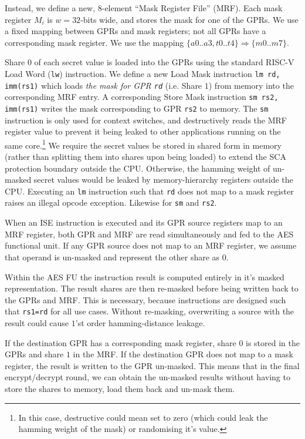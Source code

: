 Instead, we define a new, $8$-element ``Mask Register File'' (MRF).
Each mask register $M_i$ is $w=32$-bits wide, and stores the mask for
one of the GPRs.
We use a fixed mapping between GPRs and mask registers;
not all GPRs have a corresponding mask register.
We use the mapping $\{a0..a3,t0..t4\} \Rightarrow \{m0..m7\}$.

Share $0$ of each secret value is loaded into the GPRs using the
standard RISC-V Load Word ({\tt lw}) instruction.
We define a new Load Mask instruction {\tt lm rd, imm(rs1)} which
loads {\em the mask for GPR {\tt rd}}
(i.e. Share $1$)
from memory into the corresponding MRF entry.
A corresponding Store Mask instruction {\tt sm rs2, imm(rs1)} writes
the mask corresponding to GPR {\tt rs2} to memory.
The {\tt sm} instruction is only used for context switches, and
destructively reads the MRF register value to prevent it being
leaked to other applications running on the same core.\footnote{
    In this case, destructive could mean set to zero (which could
    leak the hamming weight of the mask) or randomising it's value.}
We require the secret values be stored in shared form in memory
(rather than splitting them into shares upon being loaded)
to extend the SCA protection boundary outside the CPU.
Otherwise, the hamming weight of un-masked secret values would be
leaked by memory-hierarchy registers outside the CPU.
Executing an {\tt lm} instruction such that {\tt rd} does not map to
a mask register raises an illegal opcode exception.
Likewise for {\tt sm} and {\tt rs2}.

When an ISE instruction is executed and its GPR source
registers map to an MRF register, both GPR and MRF are
read simultaneously and fed to the AES functional unit.
If any GPR source does not map to an MRF register, we assume that
operand is un-masked and represent the other share as $0$.

Within the AES FU the instruction result is computed entirely in it's
masked representation.
The result shares are then re-masked before being written back to the
GPRs and MRF.
This is necessary, because  instructions are designed
such that {\tt rs1=rd} for all use cases.
Without re-masking, overwriting a source with the result could cause 
$1$'st order hamming-distance leakage.

If the destination GPR has a corresponding
mask register, share $0$ is stored in the GPRs and share $1$ in the MRF.
If the destination GPR does not map to a mask register, the result is written
to the GPR un-masked.
This means that in the final encrypt/decrypt round, we can obtain
the un-masked results without having to store the shares to memory,
load them back and un-mask them.

